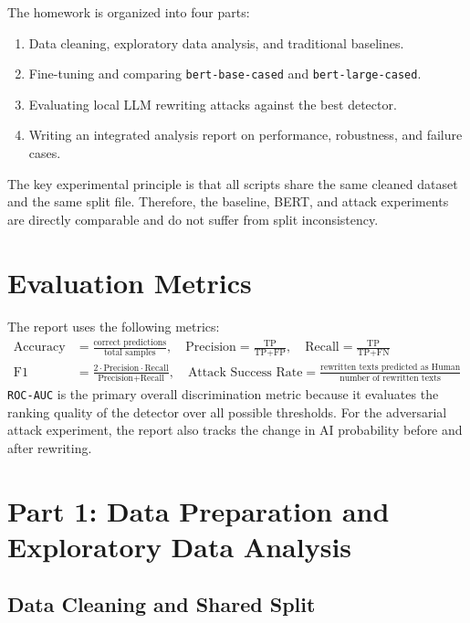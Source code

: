 \documentclass[10pt,journal,onecolumn,draftclsnofoot]{IEEEtran}
\begin{document}
The homework is organized into four parts:
\begin{enumerate}
\item Data cleaning, exploratory data analysis, and traditional baselines.
\item Fine-tuning and comparing \texttt{bert-base-cased} and \texttt{bert-large-cased}.
\item Evaluating local LLM rewriting attacks against the best detector.
\item Writing an integrated analysis report on performance, robustness, and failure cases.
\end{enumerate}

The key experimental principle is that all scripts share the same cleaned dataset and the same split file. Therefore, the baseline, BERT, and attack experiments are directly comparable and do not suffer from split inconsistency.

\section{Evaluation Metrics}

The report uses the following metrics:
\begin{align*}
\text{Accuracy} &= \frac{\text{correct predictions}}{\text{total samples}}, \quad
\text{Precision} = \frac{\text{TP}}{\text{TP} + \text{FP}}, \quad
\text{Recall} = \frac{\text{TP}}{\text{TP} + \text{FN}} \\
\text{F1} &= \frac{2 \cdot \text{Precision} \cdot \text{Recall}}{\text{Precision} + \text{Recall}}, \quad
\text{Attack Success Rate} = \frac{\text{rewritten texts predicted as Human}}{\text{number of rewritten texts}}
\end{align*}
\texttt{ROC-AUC} is the primary overall discrimination metric because it evaluates the ranking quality of the detector over all possible thresholds. For the adversarial attack experiment, the report also tracks the change in AI probability before and after rewriting.

\section{Part 1: Data Preparation and Exploratory Data Analysis}

\subsection{Data Cleaning and Shared Split}
\end{document}
